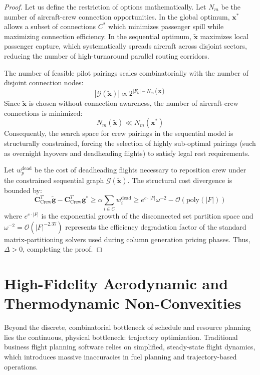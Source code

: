 \documentclass[11pt,a4paper]{book}
\begin{document}
\begin{proof}
Let us define the restriction of options mathematically. Let $N_m$ be the number of aircraft-crew connection opportunities. In the global optimum, $\mathbf{x}^*$ allows a subset of connections $C^*$ which minimizes passenger spill while maximizing connection efficiency. In the sequential optimum, $\mathbf{\tilde{x}}$ maximizes local passenger capture, which systematically spreads aircraft across disjoint sectors, reducing the number of high-turnaround parallel routing corridors. 

The number of feasible pilot pairings scales combinatorially with the number of disjoint connection nodes:
\begin{equation}
|\mathcal{G}(\mathbf{\tilde{x}})| \propto 2^{|F_k| - N_m(\mathbf{\tilde{x}})}
\end{equation}
Since $\mathbf{\tilde{x}}$ is chosen without connection awareness, the number of aircraft-crew connections is minimized:
\begin{equation}
N_m(\mathbf{\tilde{x}}) \ll N_m(\mathbf{x}^*)
\end{equation}
Consequently, the search space for crew pairings in the sequential model is structurally constrained, forcing the selection of highly sub-optimal pairings (such as overnight layovers and deadheading flights) to satisfy legal rest requirements.

Let $w_p^{\text{dead}}$ be the cost of deadheading flights necessary to reposition crew under the constrained sequential graph $\mathcal{G}(\mathbf{\tilde{x}})$. The structural cost divergence is bounded by:
\begin{equation}
\mathbf{C}_{\text{Crew}}^T \mathbf{\tilde{g}} - \mathbf{C}_{\text{Crew}}^T \mathbf{g}^* \geq \alpha \sum_{i \in C} w_i^{\text{dead}} \geq e^{c \cdot |F|} \omega^{-2} - \mathcal{O}(\text{poly}(|F|))
\end{equation}
where $e^{c \cdot |F|}$ is the exponential growth of the disconnected set partition space and $\omega^{-2} = \mathcal{O}(|F|^{-2.37})$ represents the efficiency degradation factor of the standard matrix-partitioning solvers used during column generation pricing phases. 
Thus, $\Delta > 0$, completing the proof.
\end{proof}

\section{High-Fidelity Aerodynamic and Thermodynamic Non-Convexities}

Beyond the discrete, combinatorial bottleneck of schedule and resource planning lies the continuous, physical bottleneck: trajectory optimization. Traditional business flight planning software relies on simplified, steady-state flight dynamics, which introduces massive inaccuracies in fuel planning and trajectory-based operations.
\end{document}

